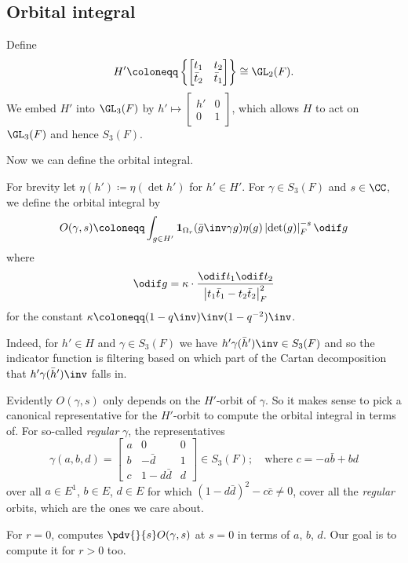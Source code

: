 \subsection{Orbital integral}
Define
\[ H' \coloneqq
  \left\{ \begin{bmatrix} t_1 & t_2 \\ \bar t_2 & \bar t_1 \end{bmatrix} \right\}
  \cong \GL_2(F). \]
We embed $H'$ into $\GL_3(F)$ by
$h' \mapsto \left[ \begin{smallmatrix} h' & 0 \\ 0 & 1 \end{smallmatrix} \right]$,
which allows $H$ to act on $\GL_3(F)$ and hence $S_3(F)$.

Now we can define the orbital integral.
\begin{definition}
  For brevity let $\eta(h') \coloneqq \eta(\det h')$ for $h' \in H'$.
  For $\gamma \in S_3(F)$ and $s \in \CC$, we define the orbital integral by
  \[ O(\gamma, s) \coloneqq
    \int_{g \in H'} \mathbf{1}_{\Omega_r}(\bar g\inv \gamma g) \eta(g)
    \left\lvert \det(g) \right\rvert_F^{-s} \odif g \]
  where
  \[ \odif g = \kappa \cdot \frac{\odif t_1 \odif t_2}
    {\left\lvert t_1 \bar t_1 - t_2 \bar t_2 \right\rvert_F^2} \]
  for the constant $\kappa \coloneqq (1-q\inv)\inv(1-q^{-2})\inv$.
\end{definition}

Indeed, for $h' \in H$ and $\gamma \in S_3(F)$ we have $h' \gamma (\bar h')\inv \in S_3(F)$
and so the indicator function is filtering based on which part of the
Cartan decomposition that $h' \gamma (\bar h')\inv$ falls in.

Evidently $O(\gamma, s)$ only depends on the $H'$-orbit of $\gamma$.
So it makes sense to pick a canonical representative for the $H'$-orbit to compute
the orbital integral in terms of.
For so-called \emph{regular} $\gamma$, the representatives
\[ \gamma(a,b,d) =
  \begin{bmatrix}
    a & 0 & 0 \\
    b & - \bar d & 1 \\
    c & 1 - d \bar d & d
  \end{bmatrix}
  \in S_3(F); \quad \text{where $c = -a \bar b + b d$} \]
over all $a \in E^1$, $b \in E$, $d \in E$ for which $(1-d\bar d)^2 - c \bar c \neq 0$,
cover all the \emph{regular} orbits, which are the ones we care about.

For $r=0$, \cite{ref:AFL} computes $\pdv{}{s}O(\gamma,s)$ at $s=0$ in terms of $a$, $b$, $d$.
Our goal is to compute it for $r > 0$ too.

